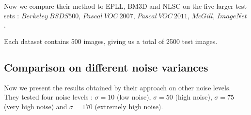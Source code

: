 \documentclass[10pt,a4paper]{article}
\newcommand{\svs}{\vspace{9pt}}
\begin{document}
\svs

Now we compare their method to EPLL, BM3D and NLSC on the five larger test sets : $Berkeley\ BSDS500$, $Pascal\ VOC\ 2007$, $Pascal\ VOC\ 2011$, $McGill$, $ImageNet$. 

Each dataset contains 500 images, giving us a total of 2500 test images.

\subsection{Comparison on different noise variances}

Now we present the results obtained by their approach on other noise levels. They tested four noise levels : $\sigma = 10$ (low noise), $\sigma = 50$
(high noise), $\sigma = 75$ (very high noise) and $\sigma = 170$ (extremely high noise).


\printbibliography
\end{document}
